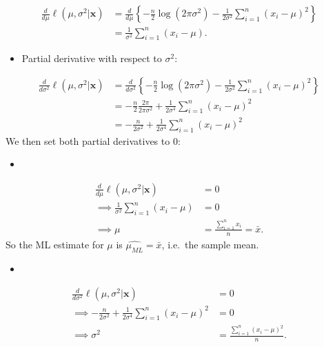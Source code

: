 \documentclass[
]{book}
\providecommand{\tightlist}{%
  \setlength{\itemsep}{0pt}\setlength{\parskip}{0pt}}
\begin{document}
\[
\begin{split}
\frac{d}{d \mu}\ell (\mu, \sigma^2 | \boldsymbol{x}) &= \frac{d}{d \mu} \left\{ -\frac{n}{2} \log (2 \pi \sigma^2) - \frac{1}{2 \sigma^2} \sum_{i=1}^n (x_i - \mu)^2 \right \} \\
                                                     &= \frac{1}{\sigma^2} \sum_{i=1}^n (x_i - \mu).
\end{split}
\]

\begin{itemize}
\tightlist
\item
  Partial derivative with respect to \(\sigma^2\):
\end{itemize}

\[
\begin{split}
\frac{d}{d \sigma^2}\ell (\mu, \sigma^2 | \boldsymbol{x}) &= \frac{d}{d \sigma^2} \left\{ -\frac{n}{2} \log (2 \pi \sigma^2) - \frac{1}{2 \sigma^2} \sum_{i=1}^n (x_i - \mu)^2 \right \} \\
                                                     &= -\frac{n}{2}\frac{2\pi}{2 \pi \sigma^2} + \frac{1}{2 \sigma^4} \sum_{i=1}^n (x_i - \mu)^2 \\
                                                     &= -\frac{n}{2 \sigma^2} + \frac{1}{2 \sigma^4} \sum_{i=1}^n (x_i - \mu)^2
\end{split}
\]
We then set both partial derivatives to 0:

\begin{itemize}
\tightlist
\item
\end{itemize}

\[
\begin{split}
\frac{d}{d \mu}\ell (\mu, \sigma^2 | \boldsymbol{x}) &= 0 \\
\implies \frac{1}{\sigma^2} \sum_{i=1}^n (x_i - \mu) &= 0 \\
\implies \mu  &= \frac{\sum_{i=1}^n x_i}{n} = \bar{x}.
\end{split}
\]
So the ML estimate for \(\mu\) is \(\hat{\mu_{ML}} = \bar{x}\), i.e.~the sample mean.

\begin{itemize}
\tightlist
\item
\end{itemize}

\[
\begin{split}
\frac{d}{d \sigma^2}\ell (\mu, \sigma^2 | \boldsymbol{x}) &= 0 \\
\implies -\frac{n}{2 \sigma^2} + \frac{1}{2 \sigma^4} \sum_{i=1}^n (x_i - \mu)^2 &= 0 \\
\implies \sigma^2 &= \frac{\sum_{i=1}^n (x_i - \mu)^2}{n}.
\end{split}
\]
\end{document}
